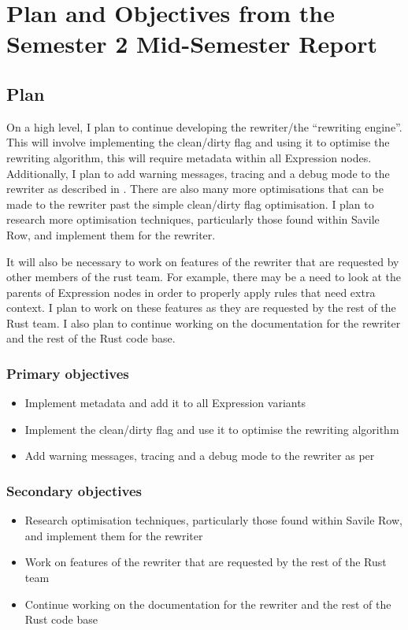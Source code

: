 \chapter{Plan and Objectives from the Semester 2 Mid-Semester Report}
\label{appendix:plan-d1-semester2}

\section{Plan}
On a high level, I plan to continue developing the rewriter/the “rewriting
engine”. This will involve implementing the clean/dirty flag and using it to
optimise the rewriting algorithm, this will require metadata within all
Expression nodes. Additionally, I plan to add warning messages, tracing and a
debug mode to the rewriter as described in . There are
also many more optimisations that can be made to the rewriter past the simple
clean/dirty flag optimisation. I plan to research more optimisation techniques,
particularly those found within Savile Row, and implement them for the
rewriter.

It will also be necessary to work on features of the rewriter that are
requested by other members of the rust team. For example, there may be a need
to look at the parents of Expression nodes in order to properly apply rules
that need extra context. I plan to work on these features as they are requested
by the rest of the Rust team. I also plan to continue working on the
documentation for the rewriter and the rest of the Rust code base.
\subsection{Primary objectives}
\begin{itemize}
    
    \item Implement metadata and add it to all Expression variants
    \item Implement the clean/dirty flag and use it to optimise the
        rewriting algorithm
    \item Add warning messages, tracing and a debug mode to the rewriter as per
\end{itemize}
\subsection{Secondary objectives}
\begin{itemize}
    
    \item Research optimisation techniques, particularly those found
        within Savile Row, and implement them for the rewriter
\item Work on features of the rewriter that are requested by the rest of
    the Rust team
\item Continue working on the documentation for the rewriter and the rest
    of the Rust code base
\end{itemize}
